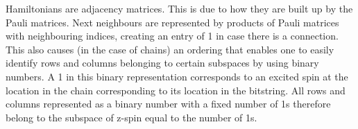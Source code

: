 \begin{center}
\end{center}

\noindent Hamiltonians are adjacency matrices\cite{Christandl2004}. This is due to how they are built up by the Pauli matrices. Next neighbours are represented by products of Pauli matrices with neighbouring indices, creating an entry of 1 in case there is a connection. This also causes (in the case of chains) an ordering that enables one to easily identify rows and columns belonging to certain subspaces by using binary numbers. A 1 in this binary representation corresponds to an excited spin at the location in the chain corresponding to its location in the bitstring. All rows and columns represented as a binary number with a fixed number of 1s therefore belong to the subspace of z-spin equal to the number of 1s.


